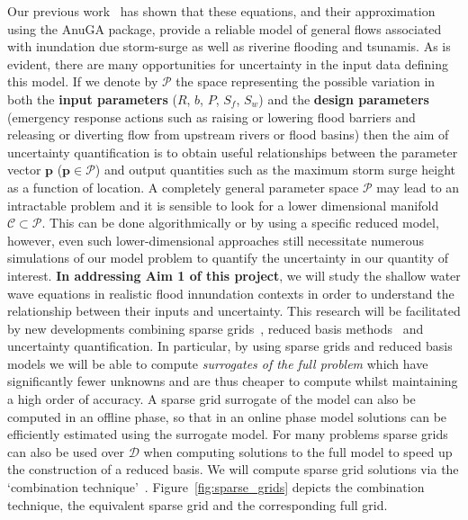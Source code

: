 Our previous work~\parencite{anugamanual,nielsen2005hydrodynamic} has shown that these
equations, and their approximation using the  AnuGA package, provide a reliable
model of general flows associated with inundation due storm-surge as well as riverine flooding and tsunamis.
As is evident, there are many opportunities for uncertainty in the input data defining this model. 
If we denote by $\mathcal{P}$ the space representing the possible variation in both the {\bf input parameters} ($R$, $b$, $P$, $S_f$, $S_w$) and the {\bf design parameters} (emergency response actions such as raising or lowering flood barriers and releasing or diverting flow from upstream rivers or flood basins) then the aim of uncertainty quantification is to obtain useful relationships between the parameter vector $\mathbf{p}$
($\mathbf{p} \in \mathcal{P}$) and output quantities such as the maximum storm surge height as a function of location. 
A completely general parameter space $\mathcal{P}$ may lead to an intractable problem and it is sensible to look for a lower dimensional manifold $\mathcal{C} \subset \mathcal{P}$.
This can be done algorithmically or by using a specific reduced model, however, even such lower-dimensional approaches still necessitate numerous simulations of our model problem to quantify the uncertainty in our quantity of interest. {\bf In addressing Aim 1 of this project}, we will study the shallow water wave equations in realistic flood innundation contexts in order to understand the relationship between their inputs and uncertainty. This research will be facilitated by new
developments combining sparse
grids~\parencite{BungartzGriebel2004}, reduced basis
methods~\parencite{LiebermanEtal2010,Peherstorfer2013,ChenSchwab2015,PeherstorferWillcox2015}
and uncertainty quantification.
 In particular, by using sparse
grids and reduced basis models we will be able to compute
\emph{surrogates of the full problem} which have significantly fewer
unknowns and are thus cheaper to compute whilst maintaining a high
order of accuracy. 
A sparse grid surrogate of
the model  can also be computed in an offline phase,
so that in an online phase model solutions can be efficiently
estimated using the surrogate model. For many problems sparse grids
can also be used over $\mathcal{D}$ when computing solutions to the full
model to speed up the construction of a reduced basis. We will compute
sparse grid solutions via the `combination
technique'~\parencite{Griebel1990}. Figure~\ref{fig:sparse_grids}
depicts the combination technique, the equivalent sparse grid and the
corresponding full grid.

